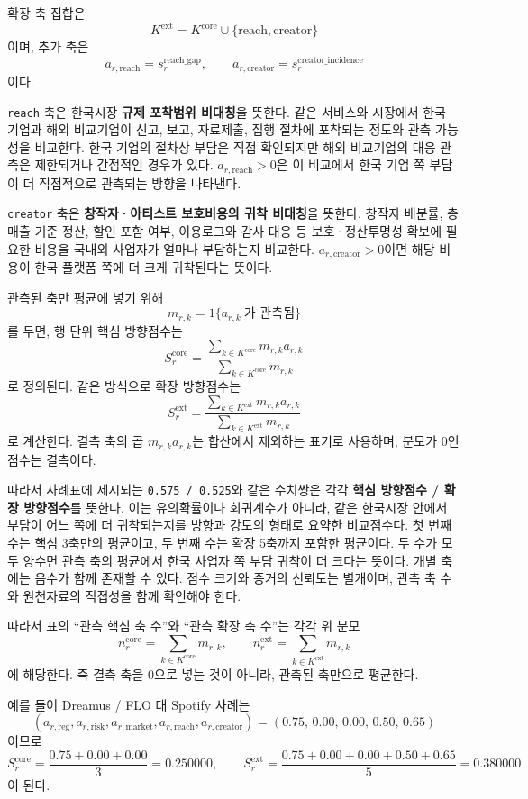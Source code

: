 \documentclass[11pt,a4paper]{report}
\begin{document}
확장 축 집합은
\[
K^{\mathrm{ext}}
=
K^{\mathrm{core}}
\cup
\{\mathrm{reach},\mathrm{creator}\}
\]
이며, 추가 축은
\[
a_{r,\mathrm{reach}}=s^{\mathrm{reach\_gap}}_r,
\qquad
a_{r,\mathrm{creator}}=s^{\mathrm{creator\_incidence}}_r
\]
이다.

\texttt{reach} 축은 한국시장 \textbf{규제 포착범위 비대칭}을 뜻한다. 같은 서비스와 시장에서 한국 기업과 해외 비교기업이 신고, 보고, 자료제출, 집행 절차에 포착되는 정도와 관측 가능성을 비교한다. 한국 기업의 절차상 부담은 직접 확인되지만 해외 비교기업의 대응 관측은 제한되거나 간접적인 경우가 있다. \(a_{r,\mathrm{reach}}>0\)은 이 비교에서 한국 기업 쪽 부담이 더 직접적으로 관측되는 방향을 나타낸다.

\texttt{creator} 축은 \textbf{창작자·아티스트 보호비용의 귀착 비대칭}을 뜻한다. 창작자 배분률, 총매출 기준 정산, 할인 포함 여부, 이용로그와 감사 대응 등 보호·정산투명성 확보에 필요한 비용을 국내외 사업자가 얼마나 부담하는지 비교한다. \(a_{r,\mathrm{creator}}>0\)이면 해당 비용이 한국 플랫폼 쪽에 더 크게 귀착된다는 뜻이다.

관측된 축만 평균에 넣기 위해
\[
m_{r,k}=1\{a_{r,k}\ \text{가 관측됨}\}
\]
를 두면, 행 단위 핵심 방향점수는
\[
S^{\mathrm{core}}_r
=
\frac{\sum_{k\in K^{\mathrm{core}}} m_{r,k}a_{r,k}}
{\sum_{k\in K^{\mathrm{core}}} m_{r,k}}
\]
로 정의된다. 같은 방식으로 확장 방향점수는
\[
S^{\mathrm{ext}}_r
=
\frac{\sum_{k\in K^{\mathrm{ext}}} m_{r,k}a_{r,k}}
{\sum_{k\in K^{\mathrm{ext}}} m_{r,k}}
\]
로 계산한다. 결측 축의 곱 \(m_{r,k}a_{r,k}\)는 합산에서 제외하는 표기로 사용하며, 분모가 0인 점수는 결측이다.

따라서 사례표에 제시되는 \texttt{0.575 / 0.525}와 같은 수치쌍은 각각 \textbf{핵심 방향점수 / 확장 방향점수}를 뜻한다. 이는 유의확률이나 회귀계수가 아니라, 같은 한국시장 안에서 부담이 어느 쪽에 더 귀착되는지를 방향과 강도의 형태로 요약한 비교점수다.
첫 번째 수는 핵심 3축만의 평균이고, 두 번째 수는 확장 5축까지 포함한 평균이다. 두 수가 모두 양수면 관측 축의 평균에서 한국 사업자 쪽 부담 귀착이 더 크다는 뜻이다. 개별 축에는 음수가 함께 존재할 수 있다. 점수 크기와 증거의 신뢰도는 별개이며, 관측 축 수와 원천자료의 직접성을 함께 확인해야 한다.

따라서 표의 ``관측 핵심 축 수''와 ``관측 확장 축 수''는 각각 위 분모
\[
n^{\mathrm{core}}_r=\sum_{k\in K^{\mathrm{core}}} m_{r,k},
\qquad
n^{\mathrm{ext}}_r=\sum_{k\in K^{\mathrm{ext}}} m_{r,k}
\]
에 해당한다. 즉 결측 축을 0으로 넣는 것이 아니라, 관측된 축만으로 평균한다.

예를 들어 Dreamus / FLO 대 Spotify 사례는
\[
\left(
a_{r,\mathrm{reg}},
a_{r,\mathrm{risk}},
a_{r,\mathrm{market}},
a_{r,\mathrm{reach}},
a_{r,\mathrm{creator}}
\right)
=(0.75,\,0.00,\,0.00,\,0.50,\,0.65)
\]
이므로
\[
S^{\mathrm{core}}_r
=
\frac{0.75+0.00+0.00}{3}
=
0.250000,
\qquad
S^{\mathrm{ext}}_r
=
\frac{0.75+0.00+0.00+0.50+0.65}{5}
=
0.380000
\]
이 된다.
\end{document}
